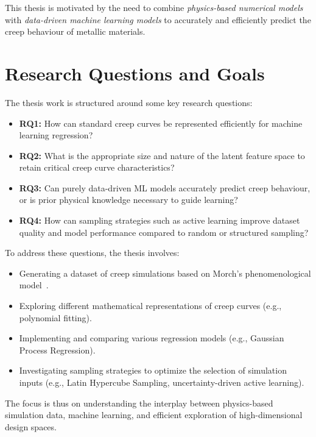 \documentclass[class=scrbook, crop=false]{standalone}
\begin{document}
This thesis is motivated by the need to combine \textit{physics-based numerical models} with \textit{data-driven machine learning models} to accurately and efficiently predict the creep behaviour of metallic materials.    

	
\section{Research Questions and Goals}
\label{Section::Research_Questions_and_Goals}
The thesis work is structured around some key research questions:

\begin{itemize}
	\item \textbf{RQ1:} How can standard creep curves be represented efficiently for machine learning regression?
	\item \textbf{RQ2:} What is the appropriate size and nature of the latent feature space to retain critical creep curve characteristics?
	\item \textbf{RQ3:} Can purely data-driven ML models accurately predict creep behaviour, or is prior physical knowledge necessary to guide learning?
	\item \textbf{RQ4:} How can sampling strategies such as active learning improve dataset quality and model performance compared to random or structured sampling?
\end{itemize}

\vspace{1em} 
\noindent To address these questions, the thesis involves:

\begin{itemize}
	\item Generating a dataset of creep simulations based on Morch’s phenomenological model~\cite{morch2022creep}.
	\item Exploring different mathematical representations of creep curves (e.g., polynomial fitting).
	\item Implementing and comparing various regression models (e.g., Gaussian Process Regression).
	\item Investigating sampling strategies to optimize the selection of simulation inputs (e.g., Latin Hypercube Sampling, uncertainty-driven active learning).
\end{itemize}

The focus is thus on understanding the interplay between physics-based simulation data, machine learning, and efficient exploration of high-dimensional design spaces.	
\end{document}
